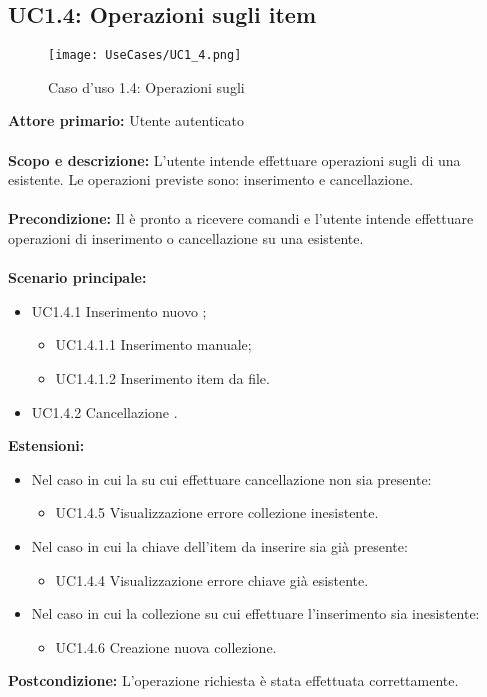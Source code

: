 \documentclass{scalatekids-article}
\begin{document}
\subsection{UC1.4: Operazioni sugli item}
\begin{figure}[H]
  \begin{center}
    \texttt{[image: UseCases/UC1\_4.png]}
    \caption*{Caso d'uso 1.4: Operazioni sugli }
  \end{center}
\end{figure}
\textbf{Attore primario:} Utente autenticato\\ \\
\textbf{Scopo e descrizione:} L'utente intende effettuare operazioni sugli  di una  esistente. Le operazioni previste sono:
inserimento e cancellazione.\\ \\
\textbf{Precondizione:} Il  è pronto a ricevere comandi e l'utente intende effettuare operazioni di inserimento o cancellazione su una  esistente.\\ \\
\textbf{Scenario principale:}
\begin{itemize}
  \item UC1.4.1 Inserimento nuovo ;
  \begin{itemize}
    \item UC1.4.1.1 Inserimento  manuale;
    \item UC1.4.1.2 Inserimento  item da file.
  \end{itemize}
  \item UC1.4.2 Cancellazione .
\end{itemize}
\textbf{Estensioni:}
\begin{itemize}
  \item Nel caso in cui la  su cui effettuare cancellazione non sia presente:
  \begin{itemize}
    \item UC1.4.5 Visualizzazione errore collezione inesistente.
  \end{itemize}
  \item Nel caso in cui la chiave dell'item da inserire sia già presente:
  \begin{itemize}
    \item UC1.4.4 Visualizzazione errore chiave già esistente.
  \end{itemize}
  \item Nel caso in cui la collezione su cui effettuare l'inserimento sia inesistente:
  \begin{itemize}
    \item UC1.4.6 Creazione nuova collezione.
  \end{itemize}
\end{itemize}
\textbf{Postcondizione:} L'operazione richiesta è stata effettuata correttamente.
\end{document}

